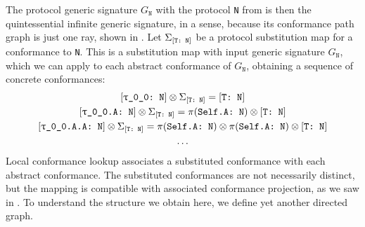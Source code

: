 \documentclass[../generics]{subfiles}
\begin{document}
\begin{figure}\label{ray conformance path graph}
\begin{center}
\end{center}
\end{figure}

The protocol generic signature $G_\texttt{N}$ with the protocol \texttt{N} from  is then the quintessential infinite generic signature, in a sense, because its conformance path graph is just one ray, shown in . Let $\Sigma_{[\texttt{T:~N}]}$ be a protocol substitution map for a conformance to \texttt{N}. This is a substitution map with input generic signature $G_\texttt{N}$, which we can apply to each abstract conformance of $G_\texttt{N}$, obtaining a sequence of concrete conformances:
\begin{gather*}
\ConfReq{\rT}{N}\otimes\Sigma_{\ConfReq{T}{N}}=\ConfReq{T}{N}\\
\ConfReq{\rT.A}{N}\otimes\Sigma_{\ConfReq{T}{N}}=\SelfAToN\otimes\ConfReq{T}{N}\\
\ConfReq{\rT.A.A}{N}\otimes\Sigma_{\ConfReq{T}{N}}=\SelfAToN\otimes\SelfAToN\otimes\ConfReq{T}{N}\\
\ldots
\end{gather*}
Local conformance lookup associates a substituted conformance with each abstract conformance. The substituted conformances are not necessarily distinct, but the mapping is compatible with associated conformance projection, as we saw in . To understand the structure we obtain here, we define yet another directed graph.
\end{document}
